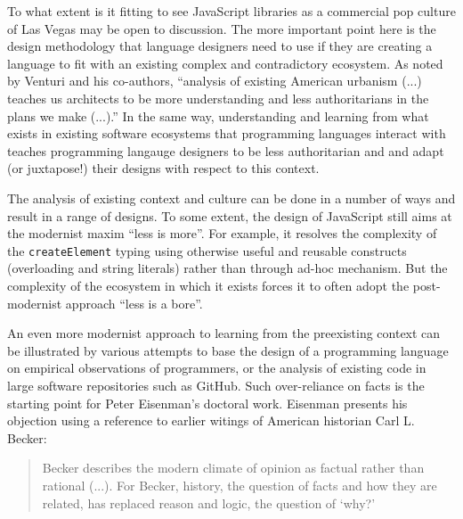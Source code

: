 To what extent is it fitting to see JavaScript libraries as a commercial pop culture of Las Vegas
may be open to discussion. The more important point here is the design methodology that
language designers need to use if they are creating a language to fit with an existing
complex and contradictory ecosystem. As noted by Venturi and his co-authors,
``analysis of existing American urbanism (...) teaches us architects to be more
understanding and less authoritarians in the plans we make (...).''
In the same way, understanding and learning from what exists in existing software ecosystems
that programming languages interact with teaches programming langauge designers to be
less authoritarian and and adapt (or juxtapose!) their designs with respect to this context.


The analysis of existing context and culture can be done in a number of ways and result in
a range of designs. To some extent, the design of JavaScript still aims at the modernist maxim
``less is more''. For example, it resolves the complexity of the \texttt{createElement} typing
using otherwise useful and reusable constructs (overloading and string literals) rather than
through ad-hoc mechanism. But the complexity of the ecosystem in which it exists forces it to
often adopt the post-modernist approach ``less is a bore''.

An even more modernist approach to learning
from the preexisting context can be illustrated by various attempts to base the design of a
programming language on empirical observations of programmers, or the analysis of existing code
in large software repositories such as GitHub. Such over-reliance on facts
is the starting point for Peter Eisenman's doctoral work. Eisenman presents his objection
using a reference to earlier witings of American historian Carl L. Becker:

\begin{quote}
Becker describes the modern climate of opinion as factual rather than
rational (...). For Becker, history, the question of facts and how they are related,
has replaced reason and logic, the question of `why?'
\end{quote}

